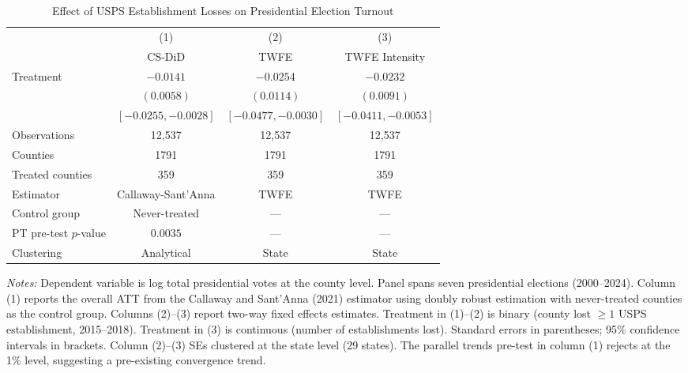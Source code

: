 \begin{table}[htbp]
\centering
\caption{Effect of USPS Establishment Losses on Presidential Election Turnout}
\label{tab:main}
\begin{tabular}{lccc}
\hline\hline
 & (1) & (2) & (3) \\
 & CS-DiD & TWFE & TWFE Intensity \\
\hline
Treatment & $-0.0141$ & $-0.0254$ & $-0.0232$ \\
 & $(0.0058)$ & $(0.0114)$ & $(0.0091)$ \\
 & $[-0.0255, -0.0028]$ & $[-0.0477, -0.0030]$ & $[-0.0411, -0.0053]$ \\
\hline
Observations & 12,537 & 12,537 & 12,537 \\
Counties & 1791 & 1791 & 1791 \\
Treated counties & 359 & 359 & 359 \\
Estimator & Callaway-Sant'Anna & TWFE & TWFE \\
Control group & Never-treated & --- & --- \\
PT pre-test $p$-value & $0.0035$ & --- & --- \\
Clustering & Analytical & State & State \\
\hline\hline
\end{tabular}
\begin{tablenotes}
\small
\item \textit{Notes:} Dependent variable is log total presidential votes at the county level. Panel spans seven presidential elections (2000--2024). Column (1) reports the overall ATT from the Callaway and Sant'Anna (2021) estimator using doubly robust estimation with never-treated counties as the control group. Columns (2)--(3) report two-way fixed effects estimates. Treatment in (1)--(2) is binary (county lost $\geq 1$ USPS establishment, 2015--2018). Treatment in (3) is continuous (number of establishments lost). Standard errors in parentheses; 95\% confidence intervals in brackets. Column (2)--(3) SEs clustered at the state level (29 states). The parallel trends pre-test in column (1) rejects at the 1\% level, suggesting a pre-existing convergence trend.
\end{tablenotes}
\end{table}
